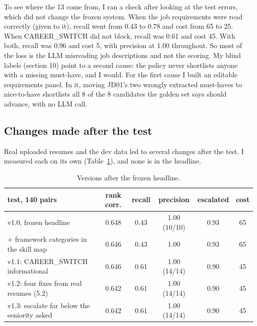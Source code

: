 \documentclass[conference]{styles/acmsiggraph}
\newcommand{\code}[1]{\textsf{\small #1}}
\begin{document}
To see where the 13 come from, I ran a check after looking at the test errors, which did not change the frozen system. When the job requirements were read correctly (given to it), recall went from 0.43 to 0.78 and cost from 65 to 25. When \code{CAREER\_SWITCH} did not block, recall was 0.61 and cost 45. With both, recall was 0.96 and cost 5, with precision at 1.00 throughout. So most of the loss is the LLM misreading job descriptions and not the scoring. My blind labels (section 10) point to a second cause: the policy never shortlists anyone with a missing must-have, and I would. For the first cause I built an editable requirements panel. In it, moving JD01's two wrongly extracted must-haves to nice-to-have shortlists all 8 of the 8 candidates the golden set says should advance, with no LLM call.

\subsection{Changes made after the test}

Real uploaded resumes and the dev data led to several changes after the test. I measured each on its own (Table~\ref{tab:ver}), and none is in the headline.

\begin{table}[t]
\centering\small
\begin{tabular}{lccccc}
\toprule
test, 140 pairs & rank corr. & recall & precision & escalated & cost \\
\midrule
v1.0, frozen headline & 0.648 & 0.43 & 1.00 (10/10) & 0.93 & 65 \\
+ framework categories in the skill map & 0.646 & 0.43 & 1.00 & 0.93 & 65 \\
v1.1: \code{CAREER\_SWITCH} informational & 0.646 & 0.61 & 1.00 (14/14) & 0.90 & 45 \\
v1.2: four fixes from real resumes (5.2) & 0.642 & 0.61 & 1.00 (14/14) & 0.90 & 45 \\
v1.3: escalate far below the seniority asked & 0.642 & 0.61 & 1.00 (14/14) & 0.90 & 45 \\
\bottomrule
\end{tabular}
\caption{Versions after the frozen headline.}
\label{tab:ver}
\end{table}
\end{document}
